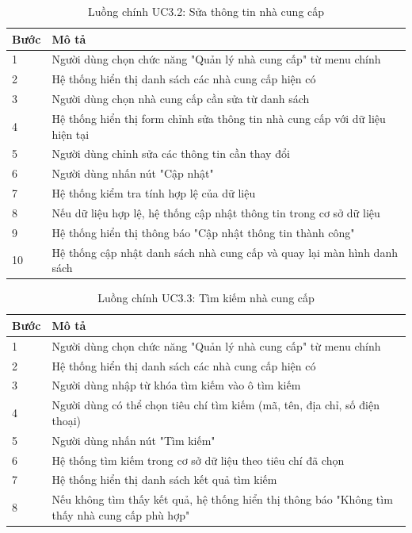 \documentclass[a4paper,12pt]{article}
\begin{document}
\begin{table}[h]
\centering
\renewcommand{\arraystretch}{0.85}
\begin{tabular}{|p{1.5cm}|p{10cm}|}
\hline
\textbf{Bước} & \textbf{Mô tả} \\
\hline
1 & Người dùng chọn chức năng "Quản lý nhà cung cấp" từ menu chính \\
\hline
2 & Hệ thống hiển thị danh sách các nhà cung cấp hiện có \\
\hline
3 & Người dùng chọn nhà cung cấp cần sửa từ danh sách \\
\hline
4 & Hệ thống hiển thị form chỉnh sửa thông tin nhà cung cấp với dữ liệu hiện tại \\
\hline
5 & Người dùng chỉnh sửa các thông tin cần thay đổi \\
\hline
6 & Người dùng nhấn nút "Cập nhật" \\
\hline
7 & Hệ thống kiểm tra tính hợp lệ của dữ liệu \\
\hline
8 & Nếu dữ liệu hợp lệ, hệ thống cập nhật thông tin trong cơ sở dữ liệu \\
\hline
9 & Hệ thống hiển thị thông báo "Cập nhật thông tin thành công" \\
\hline
10 & Hệ thống cập nhật danh sách nhà cung cấp và quay lại màn hình danh sách \\
\hline
\end{tabular}
\caption{Luồng chính UC3.2: Sửa thông tin nhà cung cấp}
\end{table}

\begin{table}[h]
\centering
\renewcommand{\arraystretch}{0.85}
\begin{tabular}{|p{1.5cm}|p{10cm}|}
\hline
\textbf{Bước} & \textbf{Mô tả} \\
\hline
1 & Người dùng chọn chức năng "Quản lý nhà cung cấp" từ menu chính \\
\hline
2 & Hệ thống hiển thị danh sách các nhà cung cấp hiện có \\
\hline
3 & Người dùng nhập từ khóa tìm kiếm vào ô tìm kiếm \\
\hline
4 & Người dùng có thể chọn tiêu chí tìm kiếm (mã, tên, địa chỉ, số điện thoại) \\
\hline
5 & Người dùng nhấn nút "Tìm kiếm" \\
\hline
6 & Hệ thống tìm kiếm trong cơ sở dữ liệu theo tiêu chí đã chọn \\
\hline
7 & Hệ thống hiển thị danh sách kết quả tìm kiếm \\
\hline
8 & Nếu không tìm thấy kết quả, hệ thống hiển thị thông báo "Không tìm thấy nhà cung cấp phù hợp" \\
\hline
\end{tabular}
\caption{Luồng chính UC3.3: Tìm kiếm nhà cung cấp}
\end{table}
\end{document}
